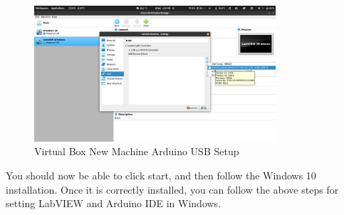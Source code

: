 \documentclass[a4paper,11pt]{report}
\begin{document}
\begin{figure}[H]
\centering
\includegraphics[width=0.8\textwidth]{screenshots/virtualboxusbarduino}
\caption{Virtual Box New Machine Arduino USB Setup}
\end{figure}

You should now be able to click start, and then follow the Windows 10 installation. Once it is correctly installed, you can follow the above steps for setting LabVIEW and Arduino IDE in Windows.

\vspace*{1\baselineskip}

\printnoidxglossary[sort=word]
\end{document}
